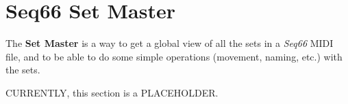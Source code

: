 %
%
%

\section{Seq66 Set Master}
\label{sec:setmaster}

   The \textbf{Set Master} is a way to get a global view of all the sets in a
   \textsl{Seq66} MIDI file, and to be able to do some simple operations
   (movement, naming, etc.) with the sets.

   CURRENTLY, this section is a PLACEHOLDER.

